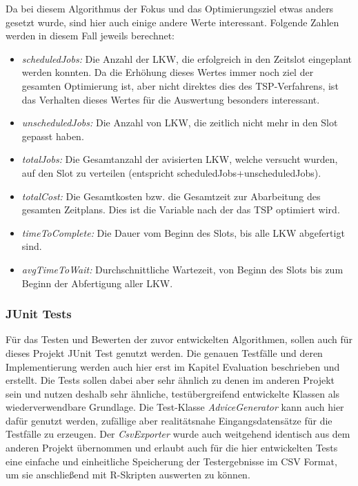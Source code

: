 Da bei diesem Algorithmus der Fokus und das Optimierungsziel etwas anders gesetzt wurde, sind hier auch einige andere Werte interessant. Folgende Zahlen werden in diesem Fall jeweils berechnet:

\begin{itemize}
    \item \textit{scheduledJobs:} Die Anzahl der LKW, die erfolgreich in den Zeitslot eingeplant werden konnten. Da die Erhöhung dieses Wertes immer noch ziel der gesamten Optimierung ist, aber nicht direktes dies des TSP-Verfahrens, ist das Verhalten dieses Wertes für die Auswertung besonders interessant.
    \item \textit{unscheduledJobs:} Die Anzahl von LKW, die zeitlich nicht mehr in den Slot gepasst haben.
    \item \textit{totalJobs:} Die Gesamtanzahl der avisierten LKW, welche versucht wurden, auf den Slot zu verteilen (entspricht scheduledJobs+unscheduledJobs).
    \item \textit{totalCost:} Die Gesamtkosten bzw. die Gesamtzeit zur Abarbeitung des gesamten Zeitplans. Dies ist die Variable nach der das TSP optimiert wird.
    \item \textit{timeToComplete:} Die Dauer vom Beginn des Slots, bis alle LKW abgefertigt sind.
    \item \textit{avgTimeToWait:} Durchschnittliche Wartezeit, von Beginn des Slots bis zum Beginn der Abfertigung aller LKW.
\end{itemize}


\subsubsection{JUnit Tests}

Für das Testen und Bewerten der zuvor entwickelten Algorithmen, sollen auch für dieses Projekt JUnit Test genutzt werden. Die genauen Testfälle und deren Implementierung werden auch hier erst im Kapitel Evaluation beschrieben und erstellt. Die Tests sollen dabei aber sehr ähnlich zu denen im anderen Projekt sein und nutzen deshalb sehr ähnliche, testübergreifend entwickelte Klassen als wiederverwendbare Grundlage. Die Test-Klasse \textit{AdviceGenerator} kann auch hier dafür genutzt werden, zufällige aber realitätsnahe Eingangsdatensätze für die Testfälle zu erzeugen. Der \textit{CsvExporter} wurde auch weitgehend identisch aus dem anderen Projekt übernommen und erlaubt auch für die hier entwickelten Tests eine einfache und einheitliche Speicherung der Testergebnisse im CSV Format, um sie anschließend mit R-Skripten auswerten zu können.